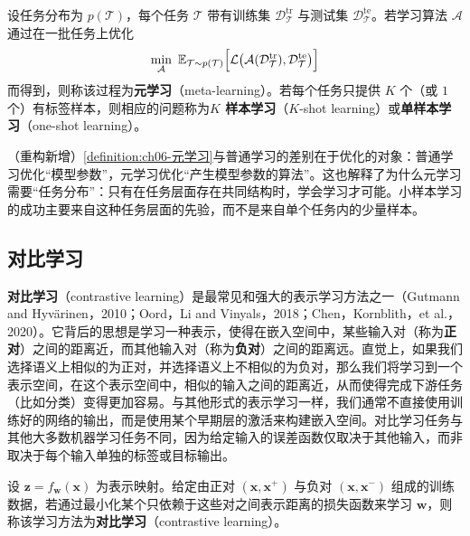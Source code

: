 \documentclass[../../main.tex]{subfiles}
\begin{document}
\begin{definition}[元学习]\label{definition:ch06-元学习}
设任务分布为 $p(\mathcal{T})$，每个任务 $\mathcal{T}$ 带有训练集 $\mathcal{D}_{\mathcal{T}}^{\mathrm{tr}}$ 与测试集 $\mathcal{D}_{\mathcal{T}}^{\mathrm{te}}$。若学习算法 $\mathcal{A}$ 通过在一批任务上优化
\begin{align}
\min_{\mathcal{A}}\ \mathbb{E}_{\mathcal{T}\sim p(\mathcal{T})}\Bigl[\mathcal{L}\bigl(\mathcal{A}(\mathcal{D}_{\mathcal{T}}^{\mathrm{tr}}),\mathcal{D}_{\mathcal{T}}^{\mathrm{te}}\bigr)\Bigr]
\label{align:ch06-元学习}
\end{align}
而得到，则称该过程为\textbf{元学习}（meta-learning）。若每个任务只提供 $K$ 个（或 $1$ 个）有标签样本，则相应的问题称为\textbf{$K$ 样本学习}（$K$-shot learning）或\textbf{单样本学习}（one-shot learning）。
\end{definition}

\begin{remark}（重构新增）\cref{definition:ch06-元学习}与普通学习的差别在于优化的对象：普通学习优化“模型参数”，元学习优化“产生模型参数的算法”。这也解释了为什么元学习需要“任务分布”：只有在任务层面存在共同结构时，学会学习才可能。小样本学习的成功主要来自这种任务层面的先验，而不是来自单个任务内的少量样本。
\end{remark}

\subsection{对比学习}\label{subsection:ch06-对比学习}

\textbf{对比学习}（contrastive learning）是最常见和强大的表示学习方法之一（Gutmann and Hyvärinen，2010；Oord，Li and Vinyals，2018；Chen，Kornblith，et al.，2020）。它背后的思想是学习一种表示，使得在嵌入空间中，某些输入对（称为\textbf{正对}）之间的距离近，而其他输入对（称为\textbf{负对}）之间的距离远。直觉上，如果我们选择语义上相似的为正对，并选择语义上不相似的为负对，那么我们将学习到一个表示空间，在这个表示空间中，相似的输入之间的距离近，从而使得完成下游任务（比如分类）变得更加容易。与其他形式的表示学习一样，我们通常不直接使用训练好的网络的输出，而是使用某个早期层的激活来构建嵌入空间。对比学习任务与其他大多数机器学习任务不同，因为给定输入的误差函数仅取决于其他输入，而非取决于每个输入单独的标签或目标输出。

\begin{definition}[对比学习]\label{definition:ch06-对比学习}
设 $\boldsymbol{z}=f_{\boldsymbol{w}}(\boldsymbol{x})$ 为表示映射。给定由正对 $(\boldsymbol{x},\boldsymbol{x}^{+})$ 与负对 $(\boldsymbol{x},\boldsymbol{x}^{-})$ 组成的训练数据，若通过最小化某个只依赖于这些对之间表示距离的损失函数来学习 $\boldsymbol{w}$，则称该学习方法为\textbf{对比学习}（contrastive learning）。
\end{definition}
\end{document}
